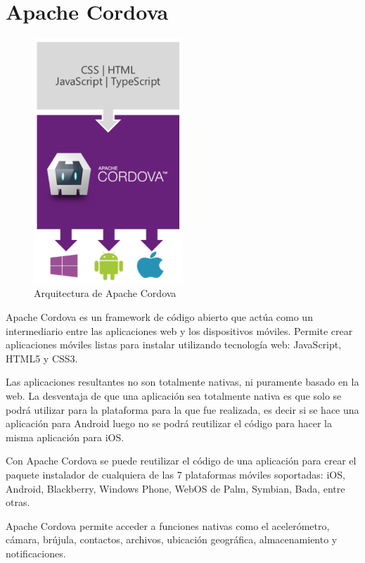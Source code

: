 \section{Apache Cordova}

\begin{figure}[H]
  \centering
    \includegraphics[width=0.5\textwidth]{imagenes/cordova-architecture.png}
    
     \caption{Arquitectura de Apache Cordova}
    \label{arquitectura-Apache Cordova}
\end{figure}

Apache Cordova es un \gls{framework} de código abierto que actúa como un intermediario entre las aplicaciones web y los dispositivos móviles. Permite crear aplicaciones móviles listas para instalar utilizando tecnología web: \gls{JavaScript}, \gls{HTML}5 y \gls{CSS}3.

Las aplicaciones resultantes no son totalmente nativas, ni puramente basado en la web. La desventaja de que una aplicación sea totalmente nativa es que solo se podrá utilizar para la plataforma para la que fue realizada, es decir si se hace una aplicación para Android luego no se podrá reutilizar el código para hacer la misma aplicación para iOS.

Con Apache Cordova se puede reutilizar el código de una aplicación para crear el paquete instalador de cualquiera de las 7 plataformas móviles soportadas: iOS, Android, Blackberry, Windows Phone, WebOS de Palm, Symbian, Bada, entre otras.

Apache Cordova permite acceder a funciones nativas como el acelerómetro, cámara, brújula, contactos, archivos, ubicación geográfica, almacenamiento  y notificaciones.

